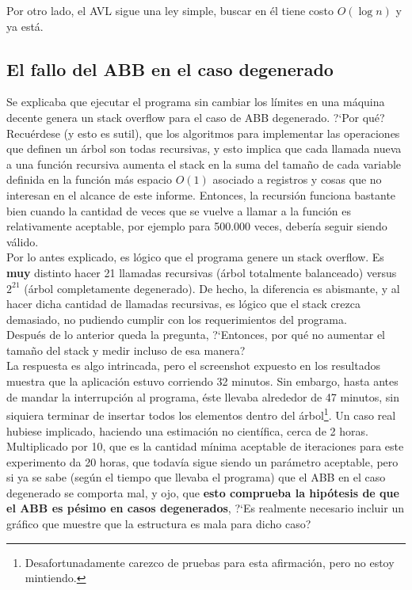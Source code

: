 \documentclass[12pt,letterpaper]{report}
\begin{document}
Por otro lado, el AVL sigue una ley simple, buscar en él tiene costo $O(\log n)$ y ya está.

\subsection{El fallo del ABB en el caso degenerado}
\label{subsec:analisis_abb_degenerado}

Se explicaba que ejecutar el programa sin cambiar los límites en una máquina decente genera un stack overflow para el caso de ABB degenerado. ?`Por qué?\\

Recuérdese (y esto es sutil), que los algoritmos para implementar las operaciones que definen un árbol son todas recursivas, y esto implica que cada llamada nueva a una función recursiva aumenta el stack en la suma del tamaño de cada variable definida en la función más espacio $O(1)$ asociado a registros y cosas que no interesan en el alcance de este informe. Entonces, la recursión funciona bastante bien cuando la cantidad de veces que se vuelve a llamar a la función es relativamente aceptable, por ejemplo para 500.000 veces, debería seguir siendo válido.\\

Por lo antes explicado, es lógico que el programa genere un stack overflow. Es \textbf{muy} distinto hacer 21 llamadas recursivas (árbol totalmente balanceado) versus $2^{21}$ (árbol completamente degenerado). De hecho, la diferencia es abismante, y al hacer dicha cantidad de llamadas recursivas, es lógico que el stack crezca demasiado, no pudiendo cumplir con los requerimientos del programa.\\

Después de lo anterior queda la pregunta, ?`Entonces, por qué no aumentar el tamaño del stack y medir incluso de esa manera?\\

La respuesta es algo intrincada, pero el screenshot expuesto en los resultados muestra que la aplicación estuvo corriendo 32 minutos. Sin embargo, hasta antes de mandar la interrupción al programa, éste llevaba alrededor de 47 minutos, sin siquiera terminar de insertar todos los elementos dentro del árbol\footnote{Desafortunadamente carezco de pruebas para esta afirmación, pero no estoy mintiendo.}. Un caso real hubiese implicado, haciendo una estimación no científica, cerca de 2 horas. Multiplicado por 10, que es la cantidad mínima aceptable de iteraciones para este experimento da 20 horas, que todavía sigue siendo un parámetro aceptable, pero si ya se sabe (según el tiempo que llevaba el programa) que el ABB en el caso degenerado se comporta mal, y ojo, que \textbf{esto comprueba la hipótesis de que el ABB es pésimo en casos degenerados}, ?`Es realmente necesario incluir un gráfico que muestre que la estructura es mala para dicho caso?\\
\end{document}
